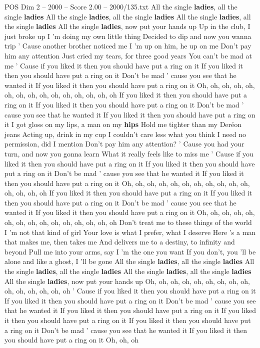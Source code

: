 \begin{textsample}{POS Dim 2 – 2000 – Score 2.00 – 2000/135.txt}  \label{ex:f2_pos_006}
All the single \textbf{ladies}, all the single \textbf{ladies} All the single \textbf{ladies}, all the single \textbf{ladies} All the single \textbf{ladies}, all the single \textbf{ladies} All the single \textbf{ladies}, now put your hands up Up in the club, I just broke up I 'm doing my own little thing Decided to dip and now you wanna trip ' Cause another brother noticed me I 'm up on him, he up on me Don't pay him any attention Just cried my tears, for three good years You can't be mad at me ' Cause if you liked it then you should have put a ring on it If you liked it then you should have put a ring on it Don't be mad ' cause you see that he wanted it If you liked it then you should have put a ring on it Oh, oh, oh, oh, oh, oh, oh, oh, oh, oh, oh, oh, oh, oh, oh If you liked it then you should have put a ring on it If you liked it then you should have put a ring on it Don't be mad ' cause you see that he wanted it If you liked it then you should have put a ring on it I got gloss on my lips, a man on my \textbf{hips} Hold me tighter than my Deréon jeans Acting up, drink in my cup I couldn't care less what you think I need no permission, did I mention Don't pay him any attention? ' Cause you had your turn, and now you gonna learn What it really feels like to miss me ' Cause if you liked it then you should have put a ring on it If you liked it then you should have put a ring on it Don't be mad ' cause you see that he wanted it If you liked it then you should have put a ring on it Oh, oh, oh, oh, oh, oh, oh, oh, oh, oh, oh, oh, oh, oh, oh If you liked it then you should have put a ring on it If you liked it then you should have put a ring on it Don't be mad ' cause you see that he wanted it If you liked it then you should have put a ring on it Oh, oh, oh, oh, oh, oh, oh, oh, oh, oh, oh, oh, oh, oh, oh Don't treat me to these things of the world I 'm not that kind of girl Your love is what I prefer, what I deserve Here 's a man that makes me, then takes me And delivers me to a destiny, to infinity and beyond Pull me into your arms, say I 'm the one you want If you don't, you 'll be alone and like a ghost, I 'll be gone All the single \textbf{ladies}, all the single \textbf{ladies} All the single \textbf{ladies}, all the single \textbf{ladies} All the single \textbf{ladies}, all the single \textbf{ladies} All the single \textbf{ladies}, now put your hands up Oh, oh, oh, oh, oh, oh, oh, oh, oh, oh, oh, oh, oh, oh, oh ' Cause if you liked it then you should have put a ring on it If you liked it then you should have put a ring on it Don't be mad ' cause you see that he wanted it If you liked it then you should have put a ring on it If you liked it then you should have put a ring on it If you liked it then you should have put a ring on it Don't be mad ' cause you see that he wanted it If you liked it then you should have put a ring on it Oh, oh, oh

\end{textsample}
